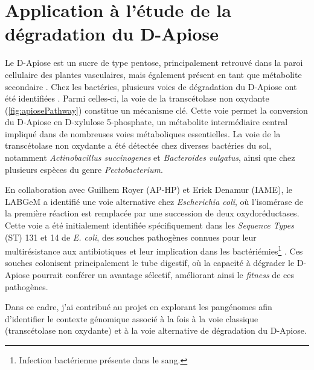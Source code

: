\chapter{Application à l'étude de la dégradation du D-Apiose}

Le D-Apiose est un sucre de type pentose, principalement retrouvé dans la paroi cellulaire des plantes vasculaires, mais également présent en tant que métabolite secondaire \cite{picmanova_apiose_2016}. Chez les bactéries, plusieurs voies de dégradation du D-Apiose ont été identifiées \cite{carter_functional_2018}. Parmi celles-ci, la voie de la transcétolase non oxydante (\autoref{fig:apiosePathway}) constitue un mécanisme clé. Cette voie permet la conversion du D-Apiose en D-xylulose 5-phosphate, un métabolite intermédiaire central impliqué dans de nombreuses voies métaboliques essentielles. La voie de la transcétolase non oxydante a été détectée chez diverses bactéries du sol, notamment \textit{Actinobacillus succinogenes} et \textit{Bacteroides vulgatus}, ainsi que chez plusieurs espèces du genre \textit{Pectobacterium}.

En collaboration avec Guilhem Royer (AP-HP) et Erick Denamur (IAME), le LABGeM a identifié une voie alternative chez \textit{Escherichia coli}, où l'isomérase de la première réaction est remplacée par une succession de deux oxydoréductases. Cette voie a été initialement identifiée spécifiquement dans les \textit{Sequence Types} (ST) 131 et 14 de \textit{E. coli}, des souches pathogènes connues pour leur multirésistance aux antibiotiques et leur implication dans les bactériémies\footnote{Infection bactérienne présente dans le sang.} \cite{schembri_molecular_2015,de_korne-elenbaas_putative_2023}. Ces souches colonisent principalement le tube digestif, où la capacité à dégrader le D-Apiose pourrait conférer un avantage sélectif, améliorant ainsi le \textit{fitness} de ces pathogènes.

Dans ce cadre, j’ai contribué au projet en explorant les pangénomes afin d’identifier le contexte génomique associé à la fois à la voie classique (transcétolase non oxydante) et à la voie alternative de dégradation du D-Apiose.


